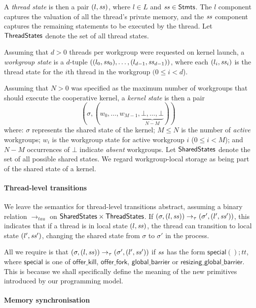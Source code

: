 \documentclass[numbers,nocopyrightspace,10pt]{sigplanconf}
\newcommand{\offerfork}{\mathsf{offer\_fork}}
\newcommand{\offerkill}{\mathsf{offer\_kill}}
\newcommand{\globalbarrier}{\mathsf{global\_barrier}}
\newcommand{\resizingglobalbarrier}{\mathsf{resizing\_global\_barrier}}
\begin{document}
A \emph{thread state} is then a pair $(l, \mathit{ss})$, where $l \in L$ and
$\mathit{ss} \in \mathsf{Stmts}$.  The $l$ component captures the valuation of all the
thread's private memory, and the $\mathit{ss}$ component captures the
remaining statements to be executed by the thread.  Let $\mathsf{ThreadStates}$ denote the set of all thread states.

Assuming that $d > 0$ threads per workgroup were requested on kernel launch, a \emph{workgroup state}
is a $d$-tuple $((l_0, \mathit{ss}_0), \dots, (l_{d-1}, \mathit{ss}_{d-1}))$, where each $(l_i, \mathit{ss}_i)$ is the thread state for the $i$th thread in the workgroup $(0\leq i < d$).

Assuming that $N > 0$ was specified as the maximum number of
workgroups that should execute the cooperative kernel, a \emph{kernel
  state} is then a pair
%
\[
(\sigma, (w_0, \dots, w_{M-1}, \underbrace{\bot, \dots,
\bot}_{N-M}))\]
%
where: $\sigma$ represents the shared state of the kernel; $M \leq N$
is the number of \emph{active} workgroups; $w_i$ is the workgroup
state for active workgroup $i$ ($0 \leq i < M$); and $N-M$ occurrences
of $\bot$ indicate \emph{absent} workgroups.  Let $\mathsf{SharedStates}$
denote the set of all possible shared states.  We regard
workgroup-local storage as being part of the shared state of a kernel.

\paragraph{Thread-level transitions}

We leave the semantics for thread-level transitions abstract, assuming
a binary relation $\rightarrow_{tau}$ on $\mathsf{SharedStates}{} \times
\mathsf{ThreadStates}{}$.  If $(\sigma, (l, \mathit{ss})) \rightarrow_{\tau}
(\sigma', (l', \mathit{ss}'))$, this indicates that if a thread is in local
state $(l, \mathit{ss})$, the thread can transition to local state $(l',
\mathit{ss}')$, changing the shared state from $\sigma$ to $\sigma'$ in the
process.

All we require is that $(\sigma, (l, \mathit{ss})) \rightarrow_{\tau}
(\sigma', (l', \mathit{ss}'))$ if $\mathit{ss}$ has the form $\mathsf{special}();
\mathit{tt}$, where $\mathsf{special}$ is one of $\offerkill$,
$\offerfork$, $\globalbarrier$ or $\resizingglobalbarrier$.  This is
because we shall specifically define the meaning of the new primitives
introduced by our programming model.

\paragraph{Memory synchronisation}
\end{document}

